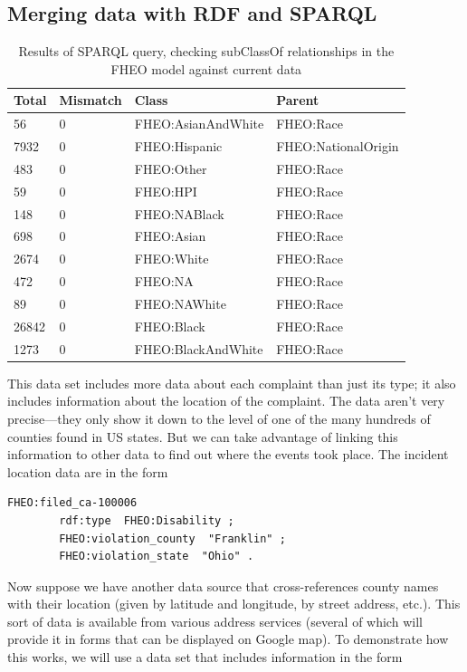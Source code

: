 \subsection{Merging data with RDF and SPARQL}



\begin{table}
\caption{Results of SPARQL query, checking subClassOf relationships in
the FHEO model against current data}
\begin{tabular}{|llll|}
\hline
Total&Mismatch&Class&Parent\\
\hline
56&0&FHEO:AsianAndWhite&FHEO:Race\\
7932&0&FHEO:Hispanic&FHEO:NationalOrigin\\
483&0&FHEO:Other&FHEO:Race\\
59&0&FHEO:HPI&FHEO:Race\\
148&0&FHEO:NABlack&FHEO:Race\\
698&0&FHEO:Asian&FHEO:Race\\
2674&0&FHEO:White&FHEO:Race\\
472&0&FHEO:NA&FHEO:Race\\
89&0&FHEO:NAWhite&FHEO:Race\\
26842&0&FHEO:Black&FHEO:Race\\
1273&0&FHEO:BlackAndWhite&FHEO:Race\\

\hline
\end{tabular}
\label{tab:ch10.1}
\end{table}

This data set includes more data about each complaint than just its
type; it also includes information about the location of the complaint.
The data aren't very precise---they only show it down to the level
of one of the many hundreds of counties found in US states. But we can
take advantage of linking this information to other data to find out
where the events took place. The incident location data are in the form

\begin{lstlisting}
FHEO:filed_ca-100006
        rdf:type  FHEO:Disability ;
        FHEO:violation_county  "Franklin" ;
        FHEO:violation_state  "Ohio" .
\end{lstlisting}

Now suppose we have another data source that cross-references county names
with their location (given by latitude and longitude, by street address,
etc.). This sort of data is available from various address services
(several of which will provide it in forms that can be displayed on
Google map). To demonstrate how this works, we will use a data set
that  includes information in the form

